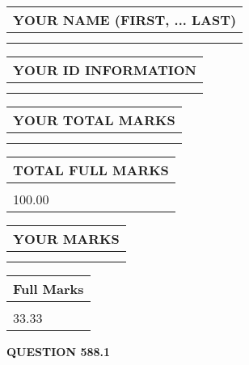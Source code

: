\documentclass{ctexart}
\begin{document}
   
   
   
\newpage 
\setcounter{page}{ 
   588001 } 
   
   
   
   
\noindent\begin{tabular}{|l|}
\hline
YOUR NAME (FIRST, ... LAST)  \\
\hline
 \\ 
 \\ 
\hline
\end{tabular}
\hspace{0.05in} \begin{tabular}{|l|}
\hline
 YOUR   ID   INFORMATION  \\
\hline
 \\ 
 \\ 
\hline
\end{tabular}
   
   
\vspace{0.2in}\noindent\begin{tabular}{|l|}
\hline
YOUR TOTAL MARKS  \\
\hline
 \\ 
 \\ 
\hline
\end{tabular}
\hspace{0.05in} \begin{tabular}{|l|}
\hline
TOTAL FULL MARKS  \\
\hline
 \\ 
100.00 \\
\hline
\end{tabular}
   
   
 \vspace{0.2in}
 
 
 
 
   
   
  
\vspace{0.2in}
  
\noindent\begin{tabular}{|l|}
\hline
 YOUR MARKS  \\
\hline
 \\ 
 \\ 
\hline
\end{tabular}
\hspace{0.05in} \begin{tabular}{|l|}
\hline
 Full Marks  \\
\hline
 \\ 
33.33 \\
\hline
\end{tabular}
{\textbf{\Large{QUESTION
588.1 
}}}
  
\end{document}
